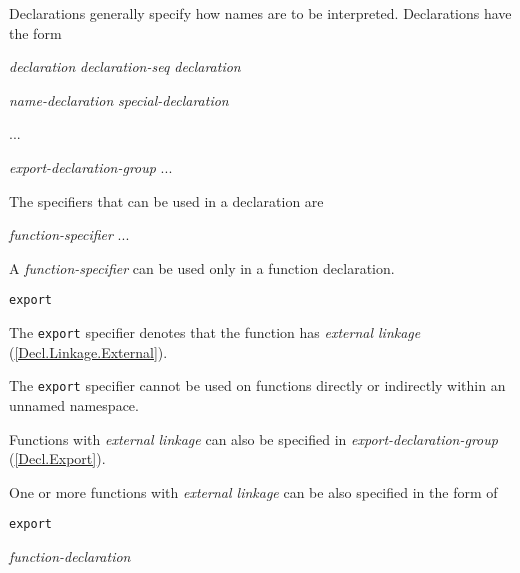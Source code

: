 \p Declarations generally specify how names are to be interpreted. Declarations have the form
\begin{grammar}
  \br
  \textit{declaration}\br
  \textit{declaration-seq declaration}

  \br
  \textit{name-declaration}\br
  \textit{special-declaration}
  
  \br
  ...

  \br
  \textit{export-declaration-group}\br
  ...
\end{grammar}

\p The specifiers that can be used in a declaration are
\begin{grammar}
  \br
  \textit{function-specifier}\br
  ...
\end{grammar}


\p A \textit{function-specifier} can be used only in a function declaration.

\begin{grammar}
  \br
  \texttt{export}\br
\end{grammar}

\p The \texttt{export} specifier denotes that the function has \textit{external linkage} (\ref{Decl.Linkage.External}).

\p The \texttt{export} specifier cannot be used on functions directly or indirectly within an unnamed namespace.

\p Functions with \textit{external linkage} can also be specified in \textit{export-declaration-group} (\ref{Decl.Export}).



\p One or more functions with \textit{external linkage} can be also specified in the form of

\begin{grammar}
  \br
  \texttt{export} \terminal{\{}  \terminal{\}}\br
  
  \br
  \textit{function-declaration} 
\end{grammar}

